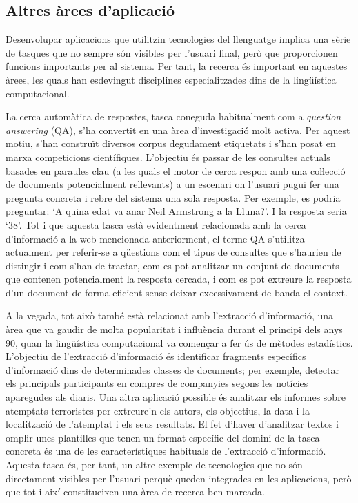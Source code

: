 \begin{multicols}{2}
\subsection{Altres àrees d'aplicació}

Desenvolupar aplicacions que utilitzin tecnologies del llenguatge implica una sèrie de tasques que no sempre són visibles per l’usuari final, però que proporcionen funcions importants per al sistema. Per tant, la recerca és important en aquestes àrees, les quals han esdevingut disciplines especialitzades dins de la lingüística computacional.

La cerca automàtica de respostes, tasca coneguda habitualment com a \textit{question answering} (QA), s’ha convertit en una àrea d’investigació molt activa. Per aquest motiu, s’han construït diversos corpus degudament etiquetats i s’han posat en marxa competicions científiques. L’objectiu és passar de les consultes actuals basades en paraules clau (a les quals el motor de cerca respon amb una coŀlecció de documents potencialment rellevants) a un escenari on l’usuari pugui fer una pregunta concreta i rebre del sistema una sola resposta. Per exemple, es podria preguntar: ‘A quina edat va anar Neil Armstrong a la Lluna?’. I la resposta seria ‘38’. Tot i que aquesta tasca està evidentment relacionada amb la cerca d’informació a la web mencionada anteriorment, el terme QA s’utilitza actualment per referir-se a qüestions com el tipus de consultes que s’haurien de distingir i com s’han de tractar, com es pot analitzar un conjunt de documents que contenen potencialment la resposta cercada, i com es pot extreure la resposta d’un document de forma eficient sense deixar excessivament de banda el context.

A la vegada, tot això també està relacionat amb l’extracció d’informació, una àrea que va gaudir de molta popularitat i influència durant el principi dels anys 90, quan la lingüística computacional va començar a fer ús de mètodes estadístics. L’objectiu de l’extracció d’informació és identificar fragments específics d’informació dins de determinades classes de documents; per exemple, detectar els principals participants en compres de companyies segons les notícies aparegudes als diaris. Una altra aplicació possible és analitzar els informes sobre atemptats terroristes per extreure’n els autors, els objectius, la data i la localització de l’atemptat i els seus resultats. El fet d’haver d’analitzar textos i omplir unes plantilles que tenen un format específic del domini de la tasca concreta és una de les característiques habituals de l’extracció d’informació. Aquesta tasca és, per tant, un altre exemple de tecnologies que no són directament visibles per l’usuari perquè queden integrades en les aplicacions, però que tot i així constitueixen una àrea de recerca ben marcada.


\end{multicols}
